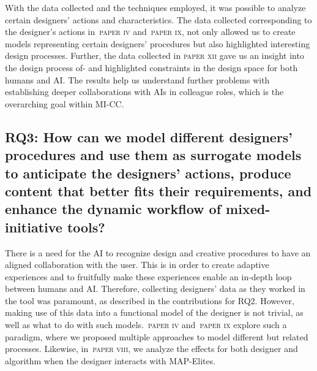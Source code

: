 

With the data collected and the techniques employed, it was possible to analyze certain designers' actions and characteristics. The data collected corresponding to the designer's actions in~\textsc{paper iv} and~\textsc{paper ix}, not only allowed us to create models representing certain designers' procedures but also highlighted interesting design processes. Further, the data collected in \textsc{paper xii} gave us an insight into the design process of- and highlighted constraints in the design space for both humans and AI. The results help us understand further problems with establishing deeper collaborations with AIs in colleague roles, which is the overarching goal within MI-CC.

\subsection[Research Question 3]{RQ3: How can we model different designers' procedures and use them as surrogate models to anticipate the designers' actions, produce content that better fits their requirements, and enhance the dynamic workflow of mixed-initiative tools?}

There is a need for the AI to recognize design and creative procedures to have an aligned collaboration with the user. This is in order to create adaptive experiences and to fruitfully make these experiences enable an in-depth loop between humans and AI. Therefore, collecting designers' data as they worked in the tool was paramount, as described in the contributions for RQ2. However, making use of this data into a functional model of the designer is not trivial, as well as what to do with such models.~\textsc{paper iv} and~\textsc{paper ix} explore such a paradigm, where we proposed multiple approaches to model different but related processes. Likewise, in~\textsc{paper viii}, we analyze the effects for both designer and algorithm when the designer interacts with MAP-Elites. %

